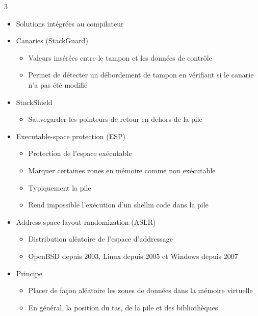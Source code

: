 \documentclass[9pt, a4paper, twoside]{article}
\begin{document}
\begin{multicols}{3}
\begin{itemize}[label=$\bullet$]
    \item \scriptsize Solutions intégrées au compilateur
    \item \scriptsize Canaries (StackGuard)
    \begin{itemize}[label=$\circ$]
        \item \scriptsize Valeurs insérées entre le tampon et les données de contrôle
        \item \scriptsize Permet de détecter un débordement de tampon en vérifiant si le canarie n'a pas été modifié
    \end{itemize}
    \item \scriptsize StackShield
    \begin{itemize}[label=$\circ$]
        \item \scriptsize Sauvegarder les pointeurs de retour en dehors de la pile
    \end{itemize}
    \item \scriptsize Executable-space protection (ESP)
    \begin{itemize}[label=$\circ$]
        \item \scriptsize Protection de l'espace exécutable
        \item \scriptsize Marquer certaines zones en mémoire comme non exécutable
        \item \scriptsize Typiquement la pile
        \item \scriptsize Rend impossible l'exécution d'un shellm code dans la pile
    \end{itemize}
    \item \scriptsize Address space layout randomization (ASLR)
    \begin{itemize}[label=$\circ$]
        \item \scriptsize Distribution aléatoire de l'espace d'addressage
        \item \scriptsize OpenBSD depuis 2003, Linux depuis 2005 et Windows depuis 2007
    \end{itemize}
    \item \scriptsize Principe
    \begin{itemize}[label=$\circ$]
        \item \scriptsize Placer de façon aléatoire les zones de données dans la mémoire virtuelle
        \item \scriptsize En général, la position du tas, de la pile et des bibliothèques
    \end{itemize}
\end{itemize}


\end{multicols}
\end{document}

